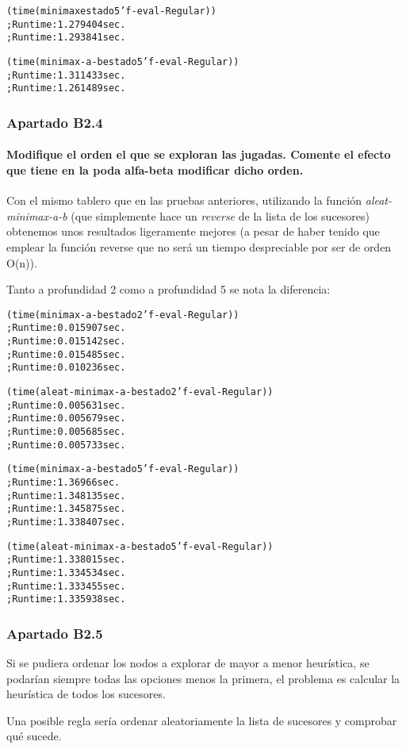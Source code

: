 \documentclass[nochap]{apuntes}
\begin{document}
\begin{alltt}
(time (minimax estado 5 'f-eval-Regular)) 
; Run time: 1.279404 sec.
; Run time: 1.293841 sec.

(time (minimax-a-b estado 5 'f-eval-Regular)) 
; Run time: 1.311433 sec.
; Run time: 1.261489 sec.
\end{alltt}

\subsubsection*{Apartado B2.4}
\paragraph{ Modifique el orden el que se exploran las jugadas. Comente el efecto que tiene en la poda alfa-beta modificar dicho orden.}

Con el mismo tablero que en las pruebas anteriores, utilizando la función \textit{aleat-minimax-a-b} (que simplemente hace un \textit{reverse} de la lista de los sucesores) obtenemos unos resultados ligeramente mejores (a pesar de haber tenido que emplear la función reverse que no será un tiempo despreciable por ser de orden O(n)).

Tanto a profundidad 2 como a profundidad 5 se nota la diferencia:


\begin{alltt}
(time (minimax-a-b estado 2 'f-eval-Regular)) 
  ; Run time: 0.015907 sec.
  ; Run time: 0.015142 sec.
  ; Run time: 0.015485 sec.
  ; Run time: 0.010236 sec.


(time (aleat-minimax-a-b estado 2 'f-eval-Regular)) 
  ; Run time: 0.005631 sec.
  ; Run time: 0.005679 sec.
  ; Run time: 0.005685 sec.
  ; Run time: 0.005733 sec.

(time (minimax-a-b estado 5 'f-eval-Regular)) 
  ; Run time: 1.36966 sec.
  ; Run time: 1.348135 sec.
  ; Run time: 1.345875 sec.
  ; Run time: 1.338407 sec.

(time (aleat-minimax-a-b estado 5 'f-eval-Regular)) 
  ; Run time: 1.338015 sec.
  ; Run time: 1.334534 sec.
  ; Run time: 1.333455 sec.
  ; Run time: 1.335938 sec.
\end{alltt}

\subsubsection*{Apartado B2.5}
Si se pudiera ordenar los nodos a explorar de mayor a menor heurística, se podarían siempre todas las opciones menos la primera, el problema es calcular la heurística de todos los sucesores. 

Una posible regla sería ordenar aleatoriamente la lista de sucesores y comprobar qué sucede.
\end{document}

